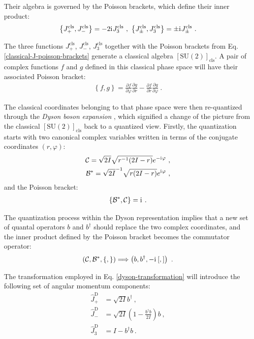 Their algebra is governed by the Poisson brackets, which define their inner product:
\begin{align}
    \left\{J_+^\text{cls},J_-^\text{cls}\right\}=-2\iu J_3^\text{cls}\ ,\ \left\{J_\pm^\text{cls},J_3^\text{cls}\right\}=\pm\iu J_{\pm}^\text{cls}\ .
    \label{classical-J-poisson-brackets}
\end{align} 

The three functions $J_+^\text{cls}$, $J_-^\text{cls}$, $J_3^\text{cls}$ together with the Poisson brackets from Eq. \ref{classical-J-poisson-brackets} generate a classical algebra $\left[\text{SU}(2)\right]_\text{cls}$. A pair of complex functions $f$ and $g$ defined in this classical phase space will have their associated Poisson bracket:
\begin{align}
    \left\{f,g\right\}=\frac{\partial f}{\partial \varphi}\frac{\partial g}{\partial r} - \frac{\partial f}{\partial r}\frac{\partial g}{\partial \varphi}\ .
\end{align} 

The classical coordinates belonging to that phase space were then re-quantized through the \emph{Dyson boson expansion} \cite{dyson1956general}, which signified a change of the picture from the classical $\left[\text{SU}(2)\right]_\text{cls}$ back to a quantized view. Firstly, the quantization starts with two canonical complex variables written in terms of the conjugate coordinates $(r, \varphi)$:
\begin{align}
    \mathcal{C}=\sqrt{2I}\sqrt{r^{-1}(2I-r)}e^{-\iu\varphi}\ ,\nonumber\\
    \mathcal{B}^*=\sqrt{2I}^{-1}\sqrt{r(2I-r)}e^{\iu\varphi}\ ,
    \label{complex-variables-dyson}
\end{align}
and the Poisson bracket:
\begin{align}
    \left\{\mathcal{B}^*,\mathcal{C}\right\}=\mathrm{i}\mkern1mu\ .
\end{align}

The quantization process within the Dyson representation implies that a new set of quantal operators $b$ and $b^\dagger$ should replace the two complex coordinates, and the inner product defined by the Poisson bracket becomes the commutator operator:
\begin{align}
    \left(\mathcal{C},\mathcal{B}^*,\{,\}\right)\Longrightarrow\left(b,b^\dagger,-\mathrm{i}\mkern1mu \left[,\right]\right)\ .
    \label{dyson-transformation}
\end{align} 

The transformation employed in Eq. \ref{dyson-transformation} will introduce the following set of angular momentum components:
\begin{align}
    \hat{J}_+^\text{D}&=\sqrt{2I}b^\dagger\ ,\nonumber\\
    \hat{J}_-^\text{D}&=\sqrt{2I}\left(1-\frac{b^\dagger b}{2I}\right)b\ ,\nonumber\\
    \hat{J}_3^\text{D}&=I-b^\dagger b\ .
    \label{dyson-boson-expansion-am-components}
\end{align}


